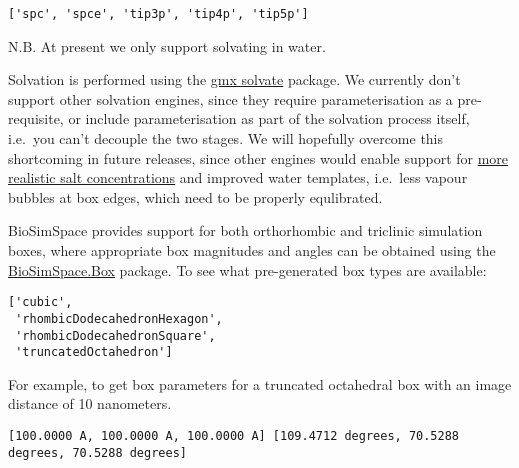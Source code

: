 \begin{verbatim}
['spc', 'spce', 'tip3p', 'tip4p', 'tip5p']
\end{verbatim}

N.B. At present we only support solvating in water.

Solvation is performed using the
\href{https://manual.gromacs.org/documentation/2018/onlinehelp/gmx-solvate.html}{gmx
solvate} package. We currently don't support other solvation engines,
since they require parameterisation as a pre-requisite, or include
parameterisation as part of the solvation process itself, i.e.~you can't
decouple the two stages. We will hopefully overcome this shortcoming in
future releases, since other engines would enable support for
\href{https://www.ncbi.nlm.nih.gov/pmc/articles/PMC6078207/}{more
realistic salt concentrations} and improved water templates, i.e.~less
vapour bubbles at box edges, which need to be properly equlibrated.

BioSimSpace provides support for both orthorhombic and triclinic
simulation boxes, where appropriate box magnitudes and angles can be
obtained using the
\href{https://biosimspace.org/api/index_Box.html}{BioSimSpace.Box}
package. To see what pre-generated box types are available:

\begin{Shaded}
\begin{Highlighting}[]
\end{Highlighting}
\end{Shaded}

\begin{verbatim}
['cubic',
 'rhombicDodecahedronHexagon',
 'rhombicDodecahedronSquare',
 'truncatedOctahedron']
\end{verbatim}

For example, to get box parameters for a truncated octahedral box with
an image distance of 10 nanometers.

\begin{Shaded}
\begin{Highlighting}[]
\OperatorTok{=}\OperatorTok{*}
\end{Highlighting}
\end{Shaded}

\begin{verbatim}
[100.0000 A, 100.0000 A, 100.0000 A] [109.4712 degrees, 70.5288 degrees, 70.5288 degrees]
\end{verbatim}

